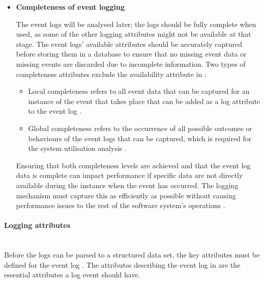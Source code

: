 \begin{itemize}
	\item \textbf{Completeness of event logging}\par The event logs will be analysed later; the logs should be fully complete when used, as some of the other logging attributes might not be available at that stage. The event logs' available attributes should be accurately captured before storing them in a database to ensure that no missing event data or missing events are discarded due to incomplete information. Two types of completeness attributes exclude the availability attribute in :

	\begin{itemize}
		\item Local completeness refers to all event data that can be captured for an instance of the event that takes place that can be added as a log attribute to the event log \cite{Kherbouche2017, VanDerAalst2004}.
		\item Global completeness refers to the occurrence of all possible outcomes or behaviours of the event logs that can be captured, which is required for the system utilisation analysis \cite{Kherbouche2017, VanDerAalst2004}.
	\end{itemize}

	Ensuring that both completeness levels are achieved and that the event log data is complete can impact performance if specific data are not directly available during the instance when the event has occurred. The logging mechanism must capture this as efficiently as possible without causing performance issues to the rest of the software system's operations \cite{Zhu2015, Zhu2019}. 
\end{itemize}

\paragraph{Logging attributes}\leavevmode\\
Before the logs can be parsed to a structured data set, the key attributes must be defined for the event log \cite{Bekeneva2020}. The attributes describing the event log in  are the essential attributes a log event should have. 

